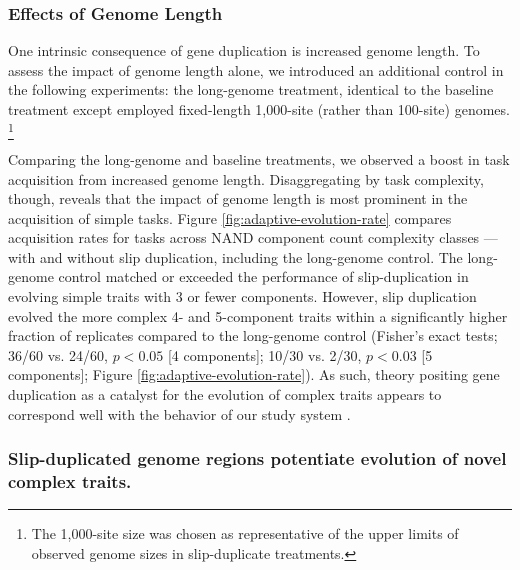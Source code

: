 \subsubsection{Effects of Genome Length}



One intrinsic consequence of gene duplication is increased genome length.
To assess the impact of genome length alone, we introduced an additional control in the following experiments: the long-genome treatment, identical to the baseline treatment except employed fixed-length 1,000-site (rather than 100-site) genomes.%
\footnote{%
The 1,000-site size was chosen as representative of the upper limits of observed genome sizes in slip-duplicate treatments.
}

Comparing the long-genome and baseline treatments, we observed a boost in task acquisition from increased genome length.
Disaggregating by task complexity, though, reveals that the impact of genome length is most prominent in the acquisition of simple tasks.
Figure \ref{fig:adaptive-evolution-rate} compares acquisition rates for tasks across NAND component count complexity classes --- with and without slip duplication, including the long-genome control.
The long-genome control matched or exceeded the performance of slip-duplication in evolving simple traits with 3 or fewer components.
However, slip duplication evolved the more complex 4- and 5-component traits within a significantly higher fraction of replicates compared to the long-genome control (Fisher's exact tests; 36/60 vs. 24/60, $p<0.05$ [4 components]; 10/30 vs. 2/30, $p<0.03$ [5 components]; Figure \ref{fig:adaptive-evolution-rate}).
As such, theory positing gene duplication as a catalyst for the evolution of complex traits appears to correspond well with the  behavior of our study system \citep{ohno1970evolution}.

\subsubsection{Slip-duplicated genome regions potentiate evolution of novel complex traits.}

